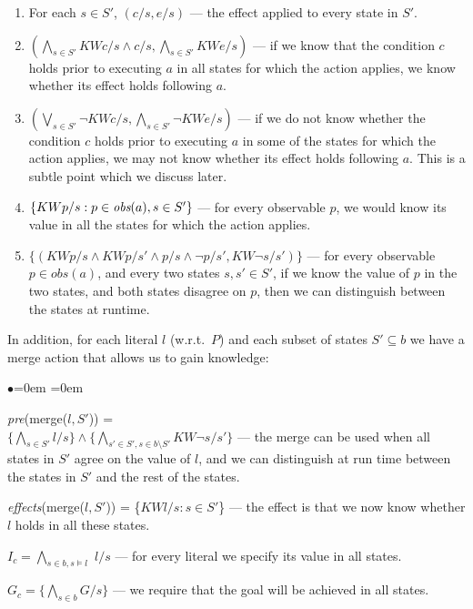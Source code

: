 \documentclass[letterpaper]{article}
\numberwithin{equation}{section}	%
\begin{document}
\begin{description}
\begin{enumerate}{\leftmargin=0em \itemindent=0em}
\item For each $s \in S'$, $(c/s,e/s)$ --- the effect applied to every state in $S'$.
\item $(\bigwedge_{s \in S'} KWc/s \wedge c/s, \bigwedge_{s \in S'} KWe/s)$ --- if we know that the condition $c$ holds prior to executing $a$ in all states for which the action applies, we know whether its effect holds following $a$.
\item $(\bigvee_{s \in S'} \neg KWc/s , \bigwedge_{s \in S'} \neg KWe/s)$ --- if we do not know whether the condition $c$ holds prior to executing $a$ in some of the states for which the action applies, we may not know whether its effect holds following $a$. This is a subtle point which we discuss later.
\item $\{KWp/s : p \in \emph{obs}(a), s \in S'\}$ --- for every observable $p$, we would know its value in all the states for which the action applies.
\item $\{(KWp/s \wedge KWp/s' \wedge p/s \wedge \neg p/s' , KW\neg s/s')\}$ --- for every observable $p \in obs(a)$, and every two states $s,s' \in S'$, if we know the value of $p$ in the two states, and both states disagree on $p$, then we can distinguish between the states at runtime.
\end{enumerate}

\item In addition, for each literal $l$ (w.r.t.~$P$) and each subset of states $S' \subseteq b$ we have a merge action that allows us to gain knowledge:
\begin{list}{$\bullet$}{\leftmargin=0em \itemindent=0em}
\item \emph{pre}(merge($l,S'$)) = \\$\{\bigwedge_{s \in S'}l/s\} \wedge \{\bigwedge_{s' \in S', s \in b\setminus S'} KW\neg s/s'\}$ --- the merge can be used when all states in $S'$ agree on the value of $l$, and we can distinguish at run time between the states in $S'$ and the rest of the states.
\item \emph{effects}(merge($l,S'$)) = \{$KWl/s : s \in S'$\} --- the effect is that we now know whether $l$ holds in all these states.
\end{list}

\item [Initial State] $I_c = \bigwedge_{s\in b,s\models l} $ $l/s$ --- for every literal we specify its value in all states.
\item [Goal] $G_c = \{\bigwedge_{s \in b} G/s \}$ --- we require that the goal will be achieved in all states.
\end{description}
\end{document}
